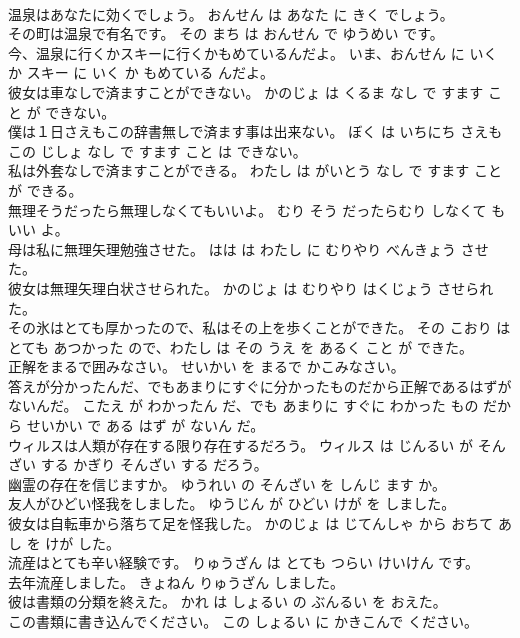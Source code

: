 \documentclass[8pt]{extreport}
\begin{document}
\begin{CJK}{UTF8}{min}
\\	温泉はあなたに効くでしょう。	おんせん は あなた に きく でしょう。	
\\	その町は温泉で有名です。	その まち は おんせん で ゆうめい です。	
\\	今、温泉に行くかスキーに行くかもめているんだよ。	いま、おんせん に いく か スキー に いく か もめている んだよ。	
\\	彼女は車なしで済ますことができない。	かのじょ は くるま なし で すます こと が できない。	
\\	僕は１日さえもこの辞書無しで済ます事は出来ない。	ぼく は いちにち さえも この じしょ なし で すます こと は できない。	
\\	私は外套なしで済ますことができる。	わたし は がいとう なし で すます こと が できる。	
\\	無理そうだったら無理しなくてもいいよ。	むり そう だったらむり しなくて も いい よ。	
\\	母は私に無理矢理勉強させた。	はは は わたし に むりやり べんきょう させた。	
\\	彼女は無理矢理白状させられた。	かのじょ は むりやり はくじょう させられた。	
\\	その氷はとても厚かったので、私はその上を歩くことができた。	その こおり は とても あつかった ので、わたし は その うえ を あるく こと が できた。	
\\	正解をまるで囲みなさい。	せいかい を まるで かこみなさい。	
\\	答えが分かったんだ、でもあまりにすぐに分かったものだから正解であるはずがないんだ。	こたえ が わかったん だ、でも あまりに すぐに わかった もの だから せいかい で ある はず が ないん だ。	
\\	ウィルスは人類が存在する限り存在するだろう。	ウィルス は じんるい が そんざい する かぎり そんざい する だろう。	
\\	幽霊の存在を信じますか。	ゆうれい の そんざい を しんじ ます か。	
\\	友人がひどい怪我をしました。	ゆうじん が ひどい けが を しました。	
\\	彼女は自転車から落ちて足を怪我した。	かのじょ は じてんしゃ から おちて あし を けが した。	
\\	流産はとても辛い経験です。	りゅうざん は とても つらい けいけん です。	
\\	去年流産しました。	きょねん りゅうざん しました。	
\\	彼は書類の分類を終えた。	かれ は しょるい の ぶんるい を おえた。	
\\	この書類に書き込んでください。	この しょるい に かきこんで ください。	

\end{CJK}
\end{document}
